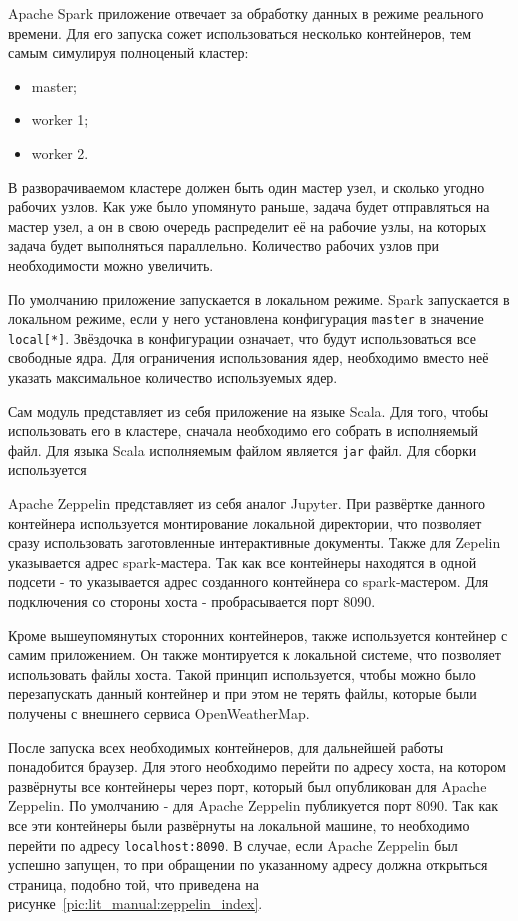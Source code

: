 Apache Spark приложение отвечает за обработку данных в режиме реального времени.
Для его запуска сожет использоваться несколько контейнеров, тем самым симулируя полноценый кластер:
\begin{itemize}
    \item master;
    \item worker 1;
    \item worker 2.
\end{itemize}

В разворачиваемом кластере должен быть один мастер узел, и сколько угодно рабочих узлов.
Как уже было упомянуто раньше, задача будет отправляться на мастер узел, а он в свою очередь распределит её на рабочие узлы, на которых задача будет выполняться параллельно.
Количество рабочих узлов при необходимости можно увеличить.

По умолчанию приложение запускается в локальном режиме.
Spark запускается в локальном режиме, если у него установлена конфигурация \texttt{master} в значение \texttt{local[*]}.
Звёздочка в конфигурации означает, что будут использоваться все свободные ядра.
Для ограничения использования ядер, необходимо вместо неё указать максимальное количество используемых ядер.

Сам модуль представляет из себя приложение на языке Scala.
Для того, чтобы использовать его в кластере, сначала необходимо его собрать в исполняемый файл.
Для языка Scala исполняемым файлом является \texttt{jar} файл.
Для сборки используется 

Apache Zeppelin представляет из себя аналог Jupyter.
При развёртке данного контейнера используется монтирование локальной директории, что позволяет сразу использовать заготовленные интерактивные документы.
Также для Zepelin указывается адрес spark-мастера.
Так как все контейнеры находятся в одной подсети - то указывается адрес созданного контейнера со spark-мастером.
Для подключения со стороны хоста - пробрасывается порт 8090.

Кроме вышеупомянутых сторонних контейнеров, также используется контейнер с самим приложением.
Он также монтируется к локальной системе, что позволяет использовать файлы хоста.
Такой принцип используется, чтобы можно было перезапускать данный контейнер и при этом не терять файлы, которые были получены с внешнего сервиса OpenWeatherMap.

После запуска всех необходимых контейнеров, для дальнейшей работы понадобится браузер.
Для этого необходимо перейти по адресу хоста, на котором развёрнуты все контейнеры через порт, который был опубликован для Apache Zeppelin.
По умолчанию - для Apache Zeppelin публикуется порт 8090.
Так как все эти контейнеры были развёрнуты на локальной машине, то необходимо перейти по адресу \texttt{localhost:8090}.
В случае, если Apache Zeppelin был успешно запущен, то при обращении по указанному адресу должна открыться страница, подобно той, что приведена на рисунке~\ref{pic:lit_manual:zeppelin_index}.

